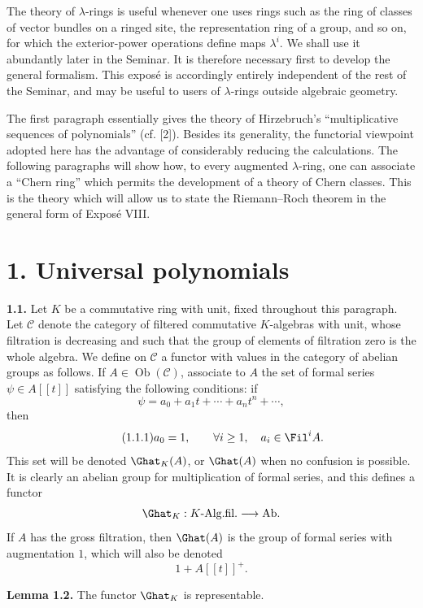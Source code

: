 The theory of \(\lambda\)-rings is useful whenever one uses rings such as the ring of classes of vector bundles on a ringed site, the representation ring of a group, and so on, for which the exterior-power operations define maps \(\lambda^i\). We shall use it abundantly later in the Seminar. It is therefore necessary first to develop the general formalism. This exposé is accordingly entirely independent of the rest of the Seminar, and may be useful to users of \(\lambda\)-rings outside algebraic geometry.

The first paragraph essentially gives the theory of Hirzebruch's ``multiplicative sequences of polynomials'' (cf. [2]). Besides its generality, the functorial viewpoint adopted here has the advantage of considerably reducing the calculations. The following paragraphs will show how, to every augmented \(\lambda\)-ring, one can associate a ``Chern ring'' which permits the development of a theory of Chern classes. This is the theory which will allow us to state the Riemann--Roch theorem in the general form of Exposé VIII.

\section*{1. Universal polynomials}

\textbf{1.1.} Let \(K\) be a commutative ring with unit, fixed throughout this paragraph. Let \(\mathcal C\) denote the category of filtered commutative \(K\)-algebras with unit, whose filtration is decreasing and such that the group of elements of filtration zero is the whole algebra. We define on \(\mathcal C\) a functor with values in the category of abelian groups as follows. If \(A\in\operatorname{Ob}(\mathcal C)\), associate to \(A\) the set of formal series \(\psi\in A[[t]]\) satisfying the following conditions: if
\[
  \psi=a_0+a_1t+\cdots+a_nt^n+\cdots ,
\]
then
\begin{equation}\tag{1.1.1}
  a_0=1,\qquad \forall i\geq 1,\quad a_i\in \Fil^i A .
\end{equation}
This set will be denoted \(\Ghat_K(A)\), or \(\Ghat(A)\) when no confusion is possible. It is clearly an abelian group for multiplication of formal series, and this defines a functor
\[
  \Ghat_K:K\text{-Alg.fil.}\longrightarrow \mathrm{Ab}.
\]
If \(A\) has the gross filtration, then \(\Ghat(A)\) is the group of formal series with augmentation \(1\), which will also be denoted
\[
  1+A[[t]]^+.
\]

\textbf{Lemma 1.2.} The functor \(\Ghat_K\) is representable.

